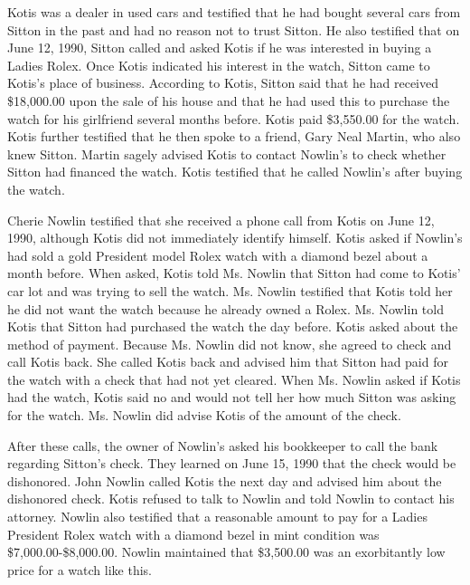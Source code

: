 Kotis was a dealer in used cars and testified that he had bought several cars
from Sitton in the past and had no reason not to trust Sitton. He also
testified that on June 12, 1990, Sitton called and asked Kotis if he was
interested in buying a Ladies Rolex. Once Kotis indicated his interest in the
watch, Sitton came to Kotis's place of business. According to Kotis, Sitton
said that he had received \$18,000.00 upon the sale of his house and that he
had used this to purchase the watch for his girlfriend several months before.
Kotis paid \$3,550.00 for the watch. Kotis further testified that he then spoke
to a friend, Gary Neal Martin, who also knew Sitton. Martin sagely advised
Kotis to contact Nowlin's to check whether Sitton had financed the watch. Kotis
testified that he called Nowlin's after buying the watch.

Cherie Nowlin testified that she received a phone call from Kotis on June 12,
1990, although Kotis did not immediately identify himself. Kotis asked if
Nowlin's had sold a gold President model Rolex watch with a diamond bezel about
a month before. When asked, Kotis told Ms. Nowlin that Sitton had come to
Kotis' car lot and was trying to sell the watch. Ms. Nowlin testified that
Kotis told her he did not want the watch because he already owned a Rolex. Ms.
Nowlin told Kotis that Sitton had purchased the watch the day before. Kotis
asked about the method of payment. Because Ms. Nowlin did not know, she agreed
to check and call Kotis back. She called Kotis back and advised him that Sitton
had paid for the watch with a check that had not yet cleared. When Ms. Nowlin
asked if Kotis had the watch, Kotis said no and would not tell her how much
Sitton was asking for the watch. Ms. Nowlin did advise Kotis of the amount of
the check.

After these calls, the owner of Nowlin's asked his bookkeeper to call the bank
regarding Sitton's check. They learned on June 15, 1990 that the check would be
dishonored. John Nowlin called Kotis the next day and advised him about the
dishonored check. Kotis refused to talk to Nowlin and told Nowlin to contact
his attorney. Nowlin also testified that a reasonable amount to pay for a
Ladies President Rolex watch with a diamond bezel in mint condition was
\$7,000.00-\$8,000.00. Nowlin maintained that \$3,500.00 was an exorbitantly
low price for a watch like this.

